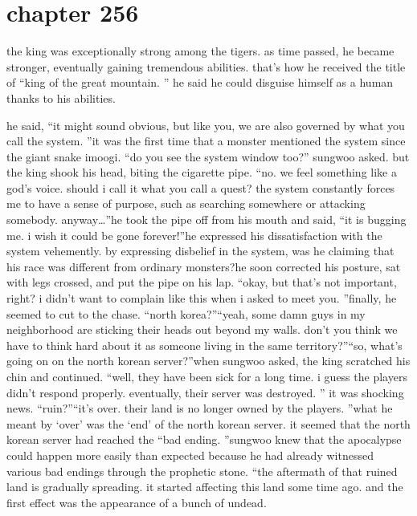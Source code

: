 \section{chapter 256}

                            the king was exceptionally strong among the tigers.
 as time passed, he became stronger, eventually gaining tremendous abilities.
 that’s how he received the title of “king of the great mountain.
” he said he could disguise himself as a human thanks to his abilities.





he said, “it might sound obvious, but like you, we are also governed by what you call the system.
”it was the first time that a monster mentioned the system since the giant snake imoogi.
“do you see the system window too?” sungwoo asked.
but the king shook his head, biting the cigarette pipe.
“no.
 we feel something like a god’s voice.
 should i call it what you call a quest? the system constantly forces me to have a sense of purpose, such as searching somewhere or attacking somebody.
 anyway…”he took the pipe off from his mouth and said, “it is bugging me.
 i wish it could be gone forever!”he expressed his dissatisfaction with the system vehemently.
 by expressing disbelief in the system, was he claiming that his race was different from ordinary monsters?he soon corrected his posture, sat with legs crossed, and put the pipe on his lap.
“okay, but that’s not important, right? i didn’t want to complain like this when i asked to meet you.
”finally, he seemed to cut to the chase.
“north korea?”“yeah, some damn guys in my neighborhood are sticking their heads out beyond my walls.
 don’t you think we have to think hard about it as someone living in the same territory?”“so, what’s going on on the north korean server?”when sungwoo asked, the king scratched his chin and continued.
“well, they have been sick for a long time.
 i guess the players didn’t respond properly.
 eventually, their server was destroyed.
”
it was shocking news.
“ruin?”“it’s over.
 their land is no longer owned by the players.
”what he meant by ‘over’ was the ‘end’ of the north korean server.
it seemed that the north korean server had reached the “bad ending.
”sungwoo knew that the apocalypse could happen more easily than expected because he had already witnessed various bad endings through the prophetic stone.
“the aftermath of that ruined land is gradually spreading.
 it started affecting this land some time ago.
 and the first effect was the appearance of a bunch of undead.
